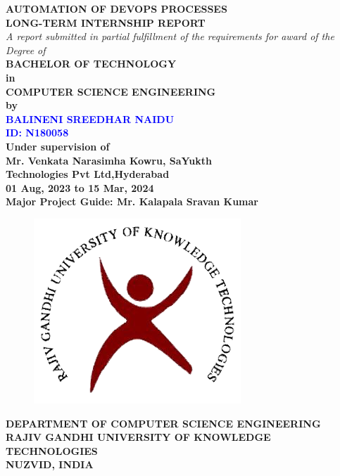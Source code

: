 \documentclass[12pt,a4paper,oneside]{report}
\date{}
\begin{document}
\thispagestyle{empty}
\begin{center}
{\Large  \MakeUppercase{\bf Automation of DevOps Processes}\\} 
\vspace{0.8cm}
{\Large  \MakeUppercase{\bf Long-Term Internship Report}\\}
\doublespacing
\vspace*{2.5cm}
{\normalsize \it A report submitted in partial fulfillment of the requirements for award of the Degree of\\
}
{\bf BACHELOR OF TECHNOLOGY }\\
{\bf in }\\
{\bf COMPUTER SCIENCE ENGINEERING }\\
{\bf by }\\
\vspace*{1cm}
{\bf\textcolor{blue} {BALINENI SREEDHAR NAIDU }}\\
{\bf \textcolor{blue}{ID: N180058}} \\
{\bf Under supervision of }\\
{\bf Mr. Venkata Narasimha Kowru, SaYukth}\\
{\bf Technologies Pvt Ltd,Hyderabad} \\
{\bf 01 Aug, 2023 to 15 Mar, 2024} \\ 
{\bf Major Project Guide: Mr. Kalapala Sravan Kumar } \\

\vspace*{0.8cm}
\begin{figure}[hbt]
\centering
\vspace*{0.6cm}
\centerline{\includegraphics[scale=0.29]{images/rgukt.png}}
\end{figure}
\vspace*{0.3cm}
{\small \bf DEPARTMENT OF COMPUTER SCIENCE ENGINEERING}\\
{\small \bf RAJIV GANDHI UNIVERSITY OF KNOWLEDGE TECHNOLOGIES}\\
{\small \bf NUZVID, INDIA\\ }
\end{center}
\end{document}
